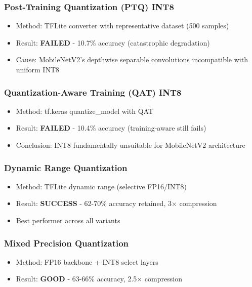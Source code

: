 \documentclass[10pt, a4paper]{article}
\begin{document}
\subsubsection{Post-Training Quantization (PTQ) INT8}
\begin{itemize}
    \item Method: TFLite converter with representative dataset (500 samples)
    \item Result: \textbf{FAILED} - 10.7\% accuracy (catastrophic degradation)
    \item Cause: MobileNetV2's depthwise separable convolutions incompatible with uniform INT8
\end{itemize}

\subsubsection{Quantization-Aware Training (QAT) INT8}
\begin{itemize}
    \item Method: tf.keras quantize\_model with QAT
    \item Result: \textbf{FAILED} - 10.4\% accuracy (training-aware still fails)
    \item Conclusion: INT8 fundamentally unsuitable for MobileNetV2 architecture
\end{itemize}

\subsubsection{Dynamic Range Quantization}
\begin{itemize}
    \item Method: TFLite dynamic range (selective FP16/INT8)
    \item Result: \textbf{SUCCESS} - 62-70\% accuracy retained, 3× compression
    \item Best performer across all variants
\end{itemize}

\subsubsection{Mixed Precision Quantization}
\begin{itemize}
    \item Method: FP16 backbone + INT8 select layers
    \item Result: \textbf{GOOD} - 63-66\% accuracy, 2.5× compression
\end{itemize}
\end{document}
